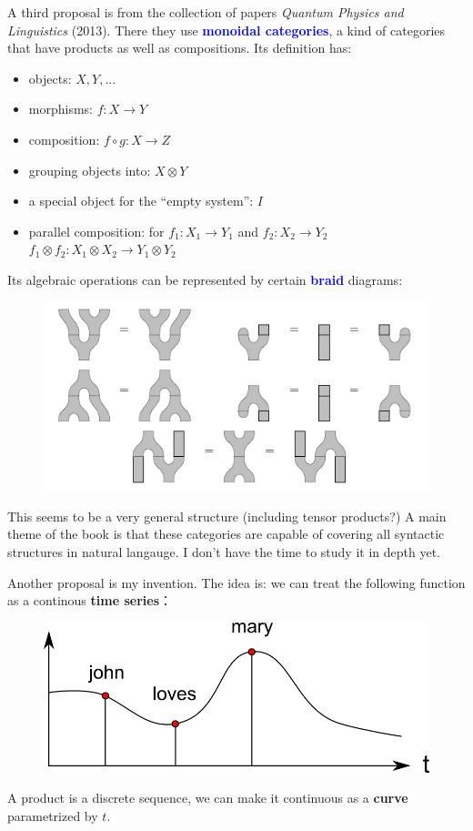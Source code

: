 \documentclass[12pt]{article}
\newcommand{\concept}[1]{\textbf{\textcolor{blue}{#1}}}
\newcommand{\tab}{\hspace*{1cm}}
\begin{document}
A third proposal is from the collection of papers \textit{Quantum Physics and Linguistics} (2013).  There they use \concept{monoidal categories}, a kind of categories that have products as well as compositions.  Its definition has:
\begin{itemize}
\item objects: $X, Y, ...$
\item morphisms: $f: X \rightarrow Y$
\item composition: $f \circ g : X \rightarrow Z$
\item grouping objects into: $X \otimes Y$
\item a special object for the ``empty system'': $I$
\item parallel composition: for $f_1: X_1 \rightarrow Y_1$ and $f_2: X_2 \rightarrow Y_2$ \\
\tab \tab $f_1 \otimes f_2: X_1 \otimes X_2 \rightarrow Y_1 \otimes Y_2$
\end{itemize}
Its algebraic operations can be represented by certain \concept{braid} diagrams:
\begin{figure}[H]
\centering
\includegraphics[scale=0.75]{frobenius_algebra.jpg}
\end{figure}
This seems to be a very general structure (including tensor products?)  A main theme of the book is that these categories are capable of covering all syntactic structures in natural langauge.  I don't have the time to study it in depth yet.

Another proposal is my invention.  The idea is:  we can treat the following function as a continous \textbf{time series}：
\begin{figure}[H]
\centering
\includegraphics[scale=0.75]{continuous-time-sequence-en.png}
\end{figure}
A product is a discrete sequence, we can make it continuous as a \textbf{curve} parametrized by $t$.
\end{document}
